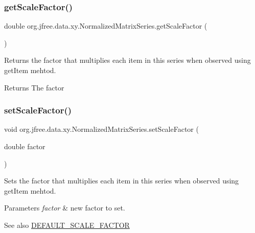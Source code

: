\subsubsection{\texorpdfstring{get\+Scale\+Factor()}{getScaleFactor()}}
{\footnotesize\ttfamily double org.\+jfree.\+data.\+xy.\+Normalized\+Matrix\+Series.\+get\+Scale\+Factor (\begin{DoxyParamCaption}{ }\end{DoxyParamCaption})}

Returns the factor that multiplies each item in this series when observed using get\+Item mehtod.

\begin{DoxyReturn}{Returns}
The factor 
\end{DoxyReturn}
\mbox{\label{classorg_1_1jfree_1_1data_1_1xy_1_1_normalized_matrix_series_acf250534ea1cda57df4cafd7fed86529}} 
\subsubsection{\texorpdfstring{set\+Scale\+Factor()}{setScaleFactor()}}
{\footnotesize\ttfamily void org.\+jfree.\+data.\+xy.\+Normalized\+Matrix\+Series.\+set\+Scale\+Factor (\begin{DoxyParamCaption}\item[{double}]{factor }\end{DoxyParamCaption})}

Sets the factor that multiplies each item in this series when observed using get\+Item mehtod.


\begin{DoxyParams}{Parameters}
{\em factor} & new factor to set.\\
\hline
\end{DoxyParams}
\begin{DoxySeeAlso}{See also}
\mbox{\hyperlink{classorg_1_1jfree_1_1data_1_1xy_1_1_normalized_matrix_series_ad4891de503293749cbd2410a7e3c7bec}{D\+E\+F\+A\+U\+L\+T\+\_\+\+S\+C\+A\+L\+E\+\_\+\+F\+A\+C\+T\+OR}} 
\end{DoxySeeAlso}
\mbox{\label{classorg_1_1jfree_1_1data_1_1xy_1_1_normalized_matrix_series_aaac2eb4602491630c87f728fb6480cfe}} 
